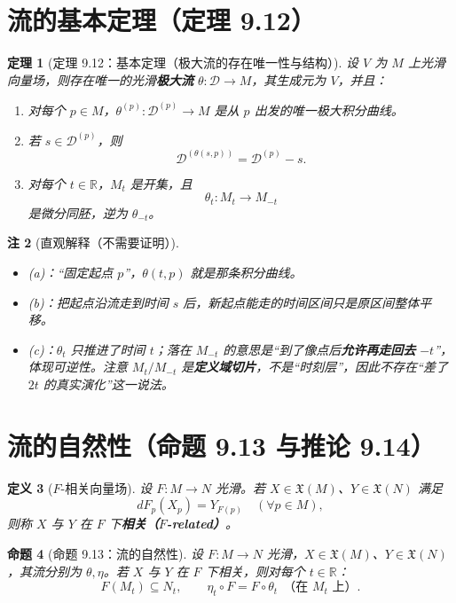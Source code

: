 \documentclass[11pt]{article}
\newtheorem{definition}{定义}[section]
\newtheorem{theorem}[definition]{定理}
\newtheorem{proposition}[definition]{命题}
\newtheorem{remark}[definition]{注}
\newcommand{\R}{\mathbb{R}}
\newcommand{\D}{\mathcal{D}}
\newcommand{\X}{\mathfrak{X}}
\begin{document}
\section{流的基本定理（定理 9.12）}

\begin{theorem}[定理 9.12：基本定理（极大流的存在唯一性与结构）]
设 $V$ 为 $M$ 上光滑向量场，则存在唯一的光滑\textbf{极大流} $\theta:\D\to M$，其生成元为 $V$，并且：
\begin{enumerate}[label=(\alph*)]
\item 对每个 $p\in M$，$\theta^{(p)}:\D^{(p)}\to M$ 是从 $p$ 出发的唯一极大积分曲线。
\item 若 $s\in\D^{(p)}$，则
\[
\D^{(\theta(s,p))}=\D^{(p)}-s.
\]
\item 对每个 $t\in\R$，$M_t$ 是开集，且
\[
\theta_t: M_t\to M_{-t}
\]
是微分同胚，逆为 $\theta_{-t}$。
\end{enumerate}
\end{theorem}

\begin{remark}[直观解释（不需要证明）]
\begin{itemize}
\item (a)：“固定起点 $p$”，$\theta(t,p)$ 就是那条积分曲线。
\item (b)：把起点沿流走到时间 $s$ 后，新起点能走的时间区间只是原区间整体平移。
\item (c)：$\theta_t$ 只推进了时间 $t$；落在 $M_{-t}$ 的意思是“到了像点后\textbf{允许再走回去} $-t$”，体现可逆性。注意 $M_t/M_{-t}$ 是\textbf{定义域切片}，不是“时刻层”，因此不存在“差了 $2t$ 的真实演化”这一说法。
\end{itemize}
\end{remark}

\section{流的自然性（命题 9.13 与推论 9.14）}

\begin{definition}[$F$-相关向量场]
设 $F:M\to N$ 光滑。若 $X\in\X(M)$、$Y\in\X(N)$ 满足
\[
dF_p(X_p)=Y_{F(p)}\quad(\forall p\in M),
\]
则称 $X$ 与 $Y$ 在 $F$ 下\textbf{相关（$F$-related）}。
\end{definition}

\begin{proposition}[命题 9.13：流的自然性]
设 $F:M\to N$ 光滑，$X\in\X(M)$、$Y\in\X(N)$，其流分别为 $\theta,\eta$。若 $X$ 与 $Y$ 在 $F$ 下相关，则对每个 $t\in\R$：
\[
F(M_t)\subseteq N_t,\qquad \eta_t\circ F=F\circ \theta_t\ \ \text{（在 }M_t\text{ 上）}.
\]
\end{proposition}
\end{document}
